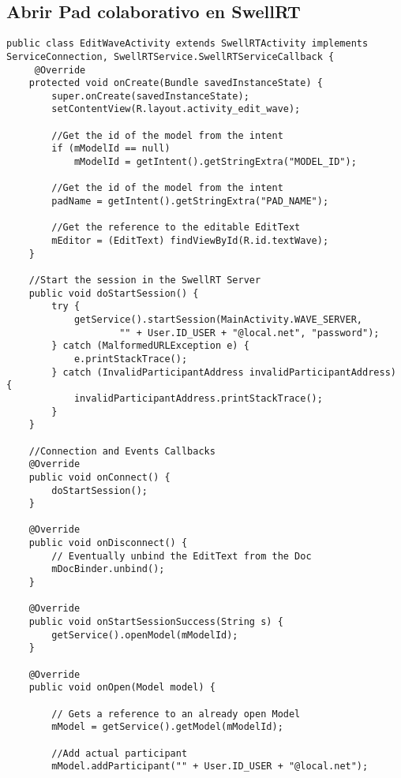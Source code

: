 \subsection{Abrir Pad colaborativo en SwellRT} \label{ssec:waveOpenPad}
	  
	 \begin{lstlisting}[frame=single] 
public class EditWaveActivity extends SwellRTActivity implements ServiceConnection, SwellRTService.SwellRTServiceCallback {
	 @Override
    protected void onCreate(Bundle savedInstanceState) {
        super.onCreate(savedInstanceState);
        setContentView(R.layout.activity_edit_wave);

		//Get the id of the model from the intent
        if (mModelId == null)
            mModelId = getIntent().getStringExtra("MODEL_ID");
		
		//Get the id of the model from the intent		
        padName = getIntent().getStringExtra("PAD_NAME");
        
        //Get the reference to the editable EditText
        mEditor = (EditText) findViewById(R.id.textWave);
    }
    
    //Start the session in the SwellRT Server
    public void doStartSession() {
        try {
            getService().startSession(MainActivity.WAVE_SERVER,
                    "" + User.ID_USER + "@local.net", "password");
        } catch (MalformedURLException e) {
            e.printStackTrace();
        } catch (InvalidParticipantAddress invalidParticipantAddress) {
            invalidParticipantAddress.printStackTrace();
        }
    }
    
    //Connection and Events Callbacks
    @Override
    public void onConnect() {
        doStartSession();
    }

    @Override
    public void onDisconnect() {
        // Eventually unbind the EditText from the Doc
        mDocBinder.unbind();
    }

    @Override
    public void onStartSessionSuccess(String s) {
        getService().openModel(mModelId);
    }

    @Override
    public void onOpen(Model model) {

        // Gets a reference to an already open Model
        mModel = getService().getModel(mModelId);

        //Add actual participant
        mModel.addParticipant("" + User.ID_USER + "@local.net");


\end{lstlisting}
